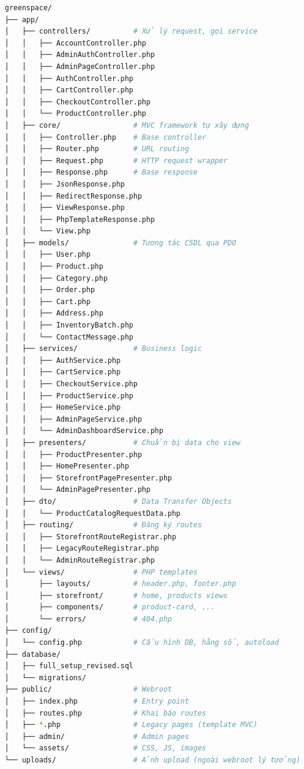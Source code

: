 \documentclass[a4paper]{article}
\begin{document}
\begin{lstlisting}[language=bash, caption=Cấu trúc thư mục dự án GreenSpace]
greenspace/
├── app/
│   ├── controllers/          # Xử lý request, gọi service
│   │   ├── AccountController.php
│   │   ├── AdminAuthController.php
│   │   ├── AdminPageController.php
│   │   ├── AuthController.php
│   │   ├── CartController.php
│   │   ├── CheckoutController.php
│   │   └── ProductController.php
│   ├── core/                 # MVC framework tự xây dựng
│   │   ├── Controller.php    # Base controller
│   │   ├── Router.php        # URL routing
│   │   ├── Request.php       # HTTP request wrapper
│   │   ├── Response.php      # Base response
│   │   ├── JsonResponse.php
│   │   ├── RedirectResponse.php
│   │   ├── ViewResponse.php
│   │   ├── PhpTemplateResponse.php
│   │   └── View.php
│   ├── models/               # Tương tác CSDL qua PDO
│   │   ├── User.php
│   │   ├── Product.php
│   │   ├── Category.php
│   │   ├── Order.php
│   │   ├── Cart.php
│   │   ├── Address.php
│   │   ├── InventoryBatch.php
│   │   └── ContactMessage.php
│   ├── services/             # Business logic
│   │   ├── AuthService.php
│   │   ├── CartService.php
│   │   ├── CheckoutService.php
│   │   ├── ProductService.php
│   │   ├── HomeService.php
│   │   ├── AdminPageService.php
│   │   └── AdminDashboardService.php
│   ├── presenters/           # Chuẩn bị data cho view
│   │   ├── ProductPresenter.php
│   │   ├── HomePresenter.php
│   │   ├── StorefrontPagePresenter.php
│   │   └── AdminPagePresenter.php
│   ├── dto/                  # Data Transfer Objects
│   │   └── ProductCatalogRequestData.php
│   ├── routing/              # Đăng ký routes
│   │   ├── StorefrontRouteRegistrar.php
│   │   ├── LegacyRouteRegistrar.php
│   │   └── AdminRouteRegistrar.php
│   └── views/                # PHP templates
│       ├── layouts/          # header.php, footer.php
│       ├── storefront/       # home, products views
│       ├── components/       # product-card, ...
│       └── errors/           # 404.php
├── config/
│   └── config.php            # Cấu hình DB, hằng số, autoload
├── database/
│   ├── full_setup_revised.sql
│   └── migrations/
├── public/                   # Webroot
│   ├── index.php             # Entry point
│   ├── routes.php            # Khai báo routes
│   ├── *.php                 # Legacy pages (template MVC)
│   ├── admin/                # Admin pages
│   └── assets/               # CSS, JS, images
└── uploads/                  # Ảnh upload (ngoài webroot lý tưởng)
\end{lstlisting}
\end{document}
